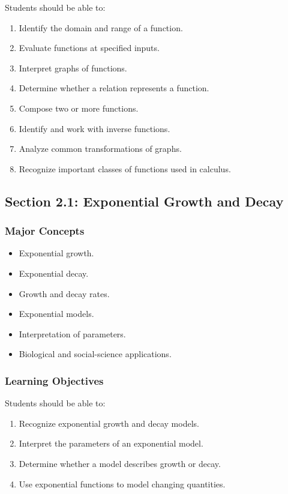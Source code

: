 \documentclass[11pt]{article}
\begin{document}
Students should be able to:

\begin{enumerate}
    \item Identify the domain and range of a function.
    \item Evaluate functions at specified inputs.
    \item Interpret graphs of functions.
    \item Determine whether a relation represents a function.
    \item Compose two or more functions.
    \item Identify and work with inverse functions.
    \item Analyze common transformations of graphs.
    \item Recognize important classes of functions used in calculus.
\end{enumerate}

\subsection{Section 2.1: Exponential Growth and Decay}

\subsubsection{Major Concepts}

\begin{itemize}
    \item Exponential growth.
    \item Exponential decay.
    \item Growth and decay rates.
    \item Exponential models.
    \item Interpretation of parameters.
    \item Biological and social-science applications.
\end{itemize}

\subsubsection{Learning Objectives}

Students should be able to:

\begin{enumerate}
    \item Recognize exponential growth and decay models.
    \item Interpret the parameters of an exponential model.
    \item Determine whether a model describes growth or decay.
    \item Use exponential functions to model changing quantities.
\end{enumerate}
\end{document}
